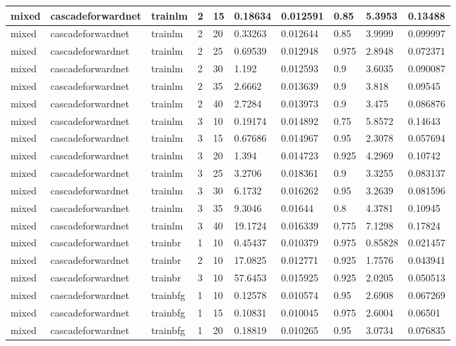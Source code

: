 \begin{longtable}{lllllllll}
mixed & cascadeforwardnet & trainlm & 2 & 15 & 0.18634 & 0.012591 & 0.85 & 5.3953 & 0.13488 \\ \hline 
mixed & cascadeforwardnet & trainlm & 2 & 20 & 0.33263 & 0.012644 & 0.85 & 3.9999 & 0.099997 \\ \hline 
mixed & cascadeforwardnet & trainlm & 2 & 25 & 0.69539 & 0.012948 & 0.975 & 2.8948 & 0.072371 \\ \hline 
mixed & cascadeforwardnet & trainlm & 2 & 30 & 1.192 & 0.012593 & 0.9 & 3.6035 & 0.090087 \\ \hline 
mixed & cascadeforwardnet & trainlm & 2 & 35 & 2.6662 & 0.013639 & 0.9 & 3.818 & 0.09545 \\ \hline 
mixed & cascadeforwardnet & trainlm & 2 & 40 & 2.7284 & 0.013973 & 0.9 & 3.475 & 0.086876 \\ \hline 
mixed & cascadeforwardnet & trainlm & 3 & 10 & 0.19174 & 0.014892 & 0.75 & 5.8572 & 0.14643 \\ \hline 
mixed & cascadeforwardnet & trainlm & 3 & 15 & 0.67686 & 0.014967 & 0.95 & 2.3078 & 0.057694 \\ \hline 
mixed & cascadeforwardnet & trainlm & 3 & 20 & 1.394 & 0.014723 & 0.925 & 4.2969 & 0.10742 \\ \hline 
mixed & cascadeforwardnet & trainlm & 3 & 25 & 3.2706 & 0.018361 & 0.9 & 3.3255 & 0.083137 \\ \hline 
mixed & cascadeforwardnet & trainlm & 3 & 30 & 6.1732 & 0.016262 & 0.95 & 3.2639 & 0.081596 \\ \hline 
mixed & cascadeforwardnet & trainlm & 3 & 35 & 9.3046 & 0.01644 & 0.8 & 4.3781 & 0.10945 \\ \hline 
mixed & cascadeforwardnet & trainlm & 3 & 40 & 19.1724 & 0.016339 & 0.775 & 7.1298 & 0.17824 \\ \hline 
mixed & cascadeforwardnet & trainbr & 1 & 10 & 0.45437 & 0.010379 & 0.975 & 0.85828 & 0.021457 \\ \hline 
mixed & cascadeforwardnet & trainbr & 2 & 10 & 17.0825 & 0.012771 & 0.925 & 1.7576 & 0.043941 \\ \hline 
mixed & cascadeforwardnet & trainbr & 3 & 10 & 57.6453 & 0.015925 & 0.925 & 2.0205 & 0.050513 \\ \hline 
mixed & cascadeforwardnet & trainbfg & 1 & 10 & 0.12578 & 0.010574 & 0.95 & 2.6908 & 0.067269 \\ \hline 
mixed & cascadeforwardnet & trainbfg & 1 & 15 & 0.10831 & 0.010045 & 0.975 & 2.6004 & 0.06501 \\ \hline 
mixed & cascadeforwardnet & trainbfg & 1 & 20 & 0.18819 & 0.010265 & 0.95 & 3.0734 & 0.076835 \\ \hline 

\end{longtable}
